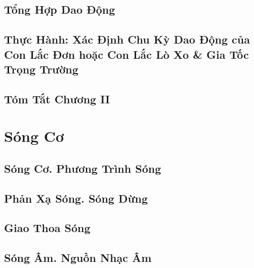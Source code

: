 \documentclass{article}
\numberwithin{equation}{section}
\begin{document}

\subsection{Tổng Hợp Dao Động}


\subsection{Thực Hành: Xác Định Chu Kỳ Dao Động của Con Lắc Đơn hoặc Con Lắc Lò Xo \& Gia Tốc Trọng Trường}


\subsection{Tóm Tắt Chương II}


\section{Sóng Cơ}

\subsection{Sóng Cơ. Phương Trình Sóng}


\subsection{Phản Xạ Sóng. Sóng Dừng}


\subsection{Giao Thoa Sóng}


\subsection{Sóng Âm. Nguồn Nhạc Âm}
\end{document}
